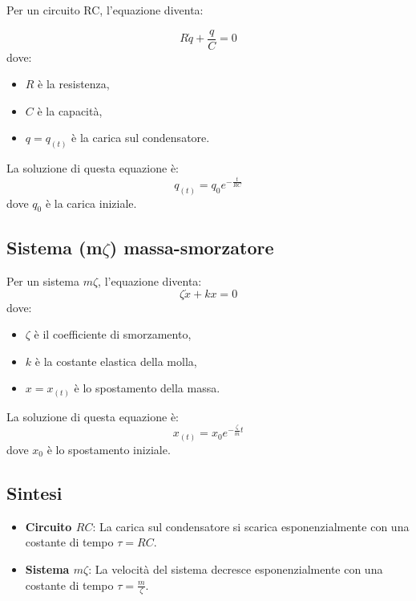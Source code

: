 \documentclass{article}
\begin{document}
Per un circuito RC, l'equazione diventa:

    \[
    R \dot{q}+\frac{q}{C} = 0
    \]
dove:
    \begin{itemize}
        \item $R$ è la resistenza,
        \item $C$ è la capacità,
        \item $q = q_{(t)}$ è la carica sul condensatore.
    \end{itemize}
La soluzione di questa equazione è:
\[
q_{(t)} = q_0 e^{-\frac{t}{RC}}
\]
dove $q_0$ è la carica iniziale.

\subsection*{Sistema (m$\zeta$) massa-smorzatore}

Per un sistema $m \zeta$, l'equazione diventa:
\[
\zeta\dot{x}+kx = 0
\]
dove:
\begin{itemize}
    \item $\zeta$ è il coefficiente di smorzamento,
    \item $k$ è la costante elastica della molla,
    \item $x = x_{(t)}$ è lo spostamento della massa.
\end{itemize}

La soluzione di questa equazione è:
\[
x_{(t)} = x_0 e^{-\frac{\zeta}{m} t}
\]
dove $x_0$ è lo spostamento iniziale.

\subsection*{Sintesi}

\begin{itemize}
    \item \textbf{Circuito $R C$}: La carica sul condensatore si scarica esponenzialmente con una costante di tempo $\tau = RC$.
    \item \textbf{Sistema $m \zeta$}: La velocità del sistema decresce esponenzialmente con una costante di tempo $\tau = \frac{m}{\zeta}$. 
\end{itemize}
\end{document}
